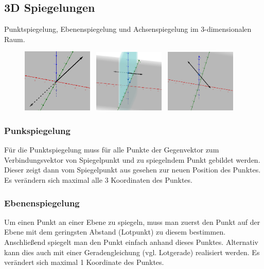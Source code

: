 \subsection{3D Spiegelungen}

Punktspiegelung, Ebenenspiegelung und Achsenspiegelung im 3-dimensionalen Raum.

\begin{figure}[H]
    \centering
    \includegraphics[width=0.3\textwidth]{images/3d-point-reflection.png} \,
    \includegraphics[width=0.3\textwidth]{images/3d-plane-reflection.png} \,
    \includegraphics[width=0.3\textwidth]{images/3d-axis-reflection.png}
\end{figure}

\subsubsection{Punkspiegelung}
Für die Punktspiegelung muss für alle Punkte der Gegenvektor zum  Verbindungsvektor von
Spiegelpunkt und zu spiegelndem Punkt gebildet werden. Dieser zeigt dann vom Spiegelpunkt
aus gesehen zur neuen Position des Punktes.
Es verändern sich maximal alle 3 Koordinaten des Punktes.

\subsubsection{Ebenenspiegelung}
Um einen Punkt an einer Ebene zu spiegeln, muss man zuerst den Punkt auf der
Ebene mit dem geringsten Abstand (Lotpunkt) zu diesem bestimmen. Anschließend
spiegelt man den Punkt einfach anhand dieses Punktes. Alternativ kann dies
auch mit einer Geradengleichung (vgl. Lotgerade) realisiert werden.
Es verändert sich maximal 1 Koordinate des Punktes.


